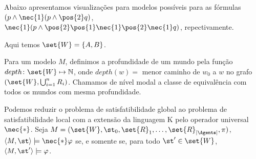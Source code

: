 Abaixo apresentamos visualizações para modelos possíveis para as fórmulas $(p \land \nec{1} (p \land \pos{2}q)$, $\nec{1} (p \land \pos{2}\pos{1}\nec{1}\pos{2}\nec{1} q)$, repectivamente.


Aqui temos $\set{W} = \{A, B\}$.



\begin{definition}
	Para um modelo $M$, definimos a profundidade de um mundo pela função $depth \colon \set{W} \mapsto \mathbb{N}$, onde $depth(w) = $ menor caminho de $w_0$ a $w$ no grafo $(\set{W}, \bigcup_{i=1}^n R_i)$. Chamamos de nível modal a classe de equivalência com todos os mundos com mesma profundidade.
\end{definition}

Podemos reduzir o problema de satisfatibilidade global ao problema de satisfatibilidade local com a extensão da linguagem K pelo operador universal $\nec{*}$. Seja $M = (\set{W}, \st_0, \set{R}_1, \ldots, \set{R}_{|\Agents|}, \pi)$, $\langle M,\st \rangle \models \nec{*}\varphi$ se, e somente se, para todo $\st' \in \set{W}$, $\langle M,\st' \rangle \models \varphi$.

